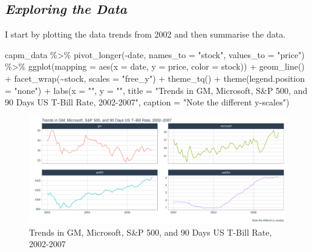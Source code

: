 \documentclass[
]{article}
\newenvironment{Shaded}{\begin{snugshade}}{\end{snugshade}}
\newcommand{\AttributeTok}[1]{\textcolor[rgb]{0.77,0.63,0.00}{#1}}
\newcommand{\FunctionTok}[1]{\textcolor[rgb]{0.00,0.00,0.00}{#1}}
\newcommand{\NormalTok}[1]{#1}
\newcommand{\SpecialCharTok}[1]{\textcolor[rgb]{0.00,0.00,0.00}{#1}}
\newcommand{\StringTok}[1]{\textcolor[rgb]{0.31,0.60,0.02}{#1}}
\begin{document}
\hypertarget{exploring-the-data}{%
\subsection{\texorpdfstring{\textbf{\emph{Exploring the
Data}}}{Exploring the Data}}\label{exploring-the-data}}

I start by plotting the data trends from 2002 and then summarise the
data.

\newpage
\begin{landscape}

\begin{Shaded}
\begin{Highlighting}[]
\NormalTok{capm\_data }\SpecialCharTok{\%\textgreater{}\%} 
    \FunctionTok{pivot\_longer}\NormalTok{(}\SpecialCharTok{{-}}\NormalTok{date, }\AttributeTok{names\_to =} \StringTok{"stock"}\NormalTok{, }\AttributeTok{values\_to =} \StringTok{"price"}\NormalTok{) }\SpecialCharTok{\%\textgreater{}\%} 
    \FunctionTok{ggplot}\NormalTok{(}\AttributeTok{mapping =} \FunctionTok{aes}\NormalTok{(}\AttributeTok{x =}\NormalTok{ date, }\AttributeTok{y =}\NormalTok{ price, }\AttributeTok{color =}\NormalTok{ stock)) }\SpecialCharTok{+} 
    \FunctionTok{geom\_line}\NormalTok{() }\SpecialCharTok{+} \FunctionTok{facet\_wrap}\NormalTok{(}\SpecialCharTok{\textasciitilde{}}\NormalTok{stock, }\AttributeTok{scales =} \StringTok{"free\_y"}\NormalTok{) }\SpecialCharTok{+} 
    \FunctionTok{theme\_tq}\NormalTok{() }\SpecialCharTok{+} \FunctionTok{theme}\NormalTok{(}\AttributeTok{legend.position =} \StringTok{"none"}\NormalTok{) }\SpecialCharTok{+} 
    \FunctionTok{labs}\NormalTok{(}\AttributeTok{x =} \StringTok{""}\NormalTok{, }\AttributeTok{y =} \StringTok{""}\NormalTok{, }\AttributeTok{title =} \StringTok{"Trends in GM, Microsoft, S\&P 500, and 90 Days US T{-}Bill Rate, 2002{-}2007"}\NormalTok{, }\AttributeTok{caption =} \StringTok{"Note the different y{-}scales"}\NormalTok{)}
\end{Highlighting}
\end{Shaded}

\begin{figure}
\centering
\includegraphics{capm_files/figure-latex/unnamed-chunk-4-1.pdf}
\caption{Trends in GM, Microsoft, S\&P 500, and 90 Days US T-Bill Rate,
2002-2007}
\end{figure}

\end{landscape}
\newpage
\end{document}
